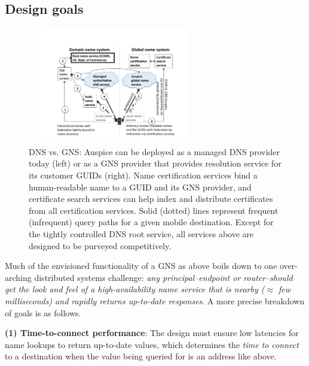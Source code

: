 \subsection{Design goals}
\label{sec:design_goals}

\begin{figure}[htbp]
	\vsp
	\begin{center}
		\includegraphics[width=3in,height=2in]{figure/DNS-GNS.pdf}
		\caption{\small{DNS vs. GNS: Auspice can be deployed as a managed DNS provider today (left) or as a GNS provider that provides resolution service for its customer GUIDs (right). Name certification services bind a human-readable name to a GUID and its GNS provider, and certificate search services can help index and distribute certificates from all certification services. Solid (dotted) lines represent frequent (infrequent) query paths for a given mobile destination. Except for the tightly controlled DNS root  service, all services above are designed to be purveyed competitively.} 
		}\label{fig:DNS_GNS}
	\end{center}
	\figvsp
\end{figure}

Much of the envisioned functionality of a GNS as above boils down to one over-arching distributed systems challenge: {\em any principal--endpoint or router--should get the look and feel of a high-availability name service that is nearby ($\approx$ few milliseconds) and rapidly returns up-to-date responses}. A more precise breakdown of goals is as follows.

{\bf (1) Time-to-connect performance}: The design must ensure low latencies  for name lookups to return up-to-date values, which determines the {\em time to connect} to a destination when the value being queried for is an address like above.  %



